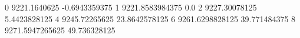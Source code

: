 0 9221.1640625 -0.6943359375
1 9221.8583984375 0.0
2 9227.30078125 5.4423828125
4 9245.72265625 23.8642578125
6 9261.6298828125 39.771484375
8 9271.5947265625 49.736328125
